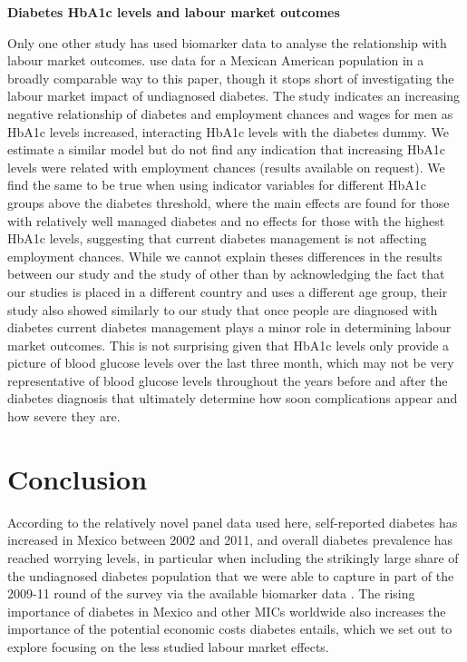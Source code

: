 \documentclass[12pt,english,british]{article}
\begin{document}
\begin{table}[h!]
\caption{\label{tab:Self-reported-diabetes-and-hba1clevels}\textbf{Diabetes HbA1c levels and labour market outcomes}}
\end{table}


Only one other study has used biomarker data to analyse the relationship with labour market outcomes. \citet{BrownIII2011} use data for a Mexican American
population in a broadly comparable way to this paper, though it stops short of investigating
the labour market impact of undiagnosed diabetes. The study indicates
an increasing negative relationship of diabetes and employment
chances and wages for men as \ac{HbA1c} levels increased, interacting \ac{HbA1c} levels
with the diabetes dummy. We estimate a similar model but
do not find any indication that increasing \ac{HbA1c} levels were
related with employment chances (results available on request). We
find the same to be true when using indicator variables for different
\ac{HbA1c} groups above the diabetes threshold, where the main effects
are found for those with relatively well managed diabetes and no
effects for those with the highest \ac{HbA1c} levels, suggesting that current diabetes management is not affecting employment chances. While we cannot explain theses differences in the results between our study and the study of \citet{BrownIII2011} other than by acknowledging the fact that our studies is placed in a different country and uses a different age group, their study also showed similarly to our study that once people are diagnosed with diabetes current diabetes management plays a minor role in determining labour market outcomes. This is not surprising given that \ac{HbA1c} levels only provide a picture of blood glucose levels over the last three month, which may not be very representative of blood glucose levels throughout the years before and after the diabetes diagnosis that ultimately determine how soon complications appear and how severe they are.


\section{\label{sec:Conclusion}Conclusion}

According to the relatively novel panel data used here, self-reported diabetes has increased in Mexico between 2002 and 2011, and overall
diabetes prevalence has reached worrying
levels, in particular when including the strikingly large share of the undiagnosed diabetes population that we were able to capture in part of the 2009-11 round of the survey via the available biomarker data \citep{Frankenberg2015}. The rising importance of diabetes in Mexico and other \ac{MICs} worldwide also increases the importance of the potential economic costs diabetes entails, which we set out to explore focusing on the less studied labour market effects.
\end{document}
